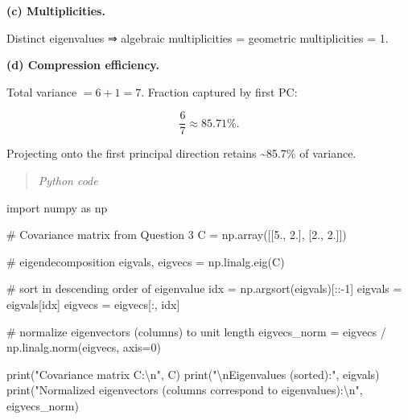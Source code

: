\documentclass[
  letterpaper,
  DIV=11,
  numbers=noendperiod]{scrreprt}
\newenvironment{Shaded}{\begin{snugshade}}{\end{snugshade}}
\newcommand{\BuiltInTok}[1]{\textcolor[rgb]{0.00,0.23,0.31}{#1}}
\newcommand{\CharTok}[1]{\textcolor[rgb]{0.13,0.47,0.30}{#1}}
\newcommand{\CommentTok}[1]{\textcolor[rgb]{0.37,0.37,0.37}{#1}}
\newcommand{\DecValTok}[1]{\textcolor[rgb]{0.68,0.00,0.00}{#1}}
\newcommand{\FloatTok}[1]{\textcolor[rgb]{0.68,0.00,0.00}{#1}}
\newcommand{\ImportTok}[1]{\textcolor[rgb]{0.00,0.46,0.62}{#1}}
\newcommand{\NormalTok}[1]{\textcolor[rgb]{0.00,0.23,0.31}{#1}}
\newcommand{\OperatorTok}[1]{\textcolor[rgb]{0.37,0.37,0.37}{#1}}
\newcommand{\StringTok}[1]{\textcolor[rgb]{0.13,0.47,0.30}{#1}}
\begin{document}
\textbf{(c) Multiplicities.}

Distinct eigenvalues ⇒ algebraic multiplicities = geometric
multiplicities = 1.

\textbf{(d) Compression efficiency.}

Total variance \(=6+1=7\). Fraction captured by first PC:

\[\frac{6}{7}\approx 85.71\%.\]

Projecting onto the first principal direction retains
\textasciitilde85.7\% of variance.

\begin{quote}
\emph{Python code}
\end{quote}

\begin{Shaded}
\begin{Highlighting}[]
\ImportTok{import}\NormalTok{ numpy }\ImportTok{as}\NormalTok{ np}

\CommentTok{\# Covariance matrix from Question 3}
\NormalTok{C }\OperatorTok{=}\NormalTok{ np.array([[}\FloatTok{5.}\NormalTok{, }\FloatTok{2.}\NormalTok{],}
\NormalTok{              [}\FloatTok{2.}\NormalTok{, }\FloatTok{2.}\NormalTok{]])}

\CommentTok{\# eigendecomposition}
\NormalTok{eigvals, eigvecs }\OperatorTok{=}\NormalTok{ np.linalg.eig(C)}

\CommentTok{\# sort in descending order of eigenvalue}
\NormalTok{idx }\OperatorTok{=}\NormalTok{ np.argsort(eigvals)[::}\OperatorTok{{-}}\DecValTok{1}\NormalTok{]}
\NormalTok{eigvals }\OperatorTok{=}\NormalTok{ eigvals[idx]}
\NormalTok{eigvecs }\OperatorTok{=}\NormalTok{ eigvecs[:, idx]}

\CommentTok{\# normalize eigenvectors (columns) to unit length}
\NormalTok{eigvecs\_norm }\OperatorTok{=}\NormalTok{ eigvecs }\OperatorTok{/}\NormalTok{ np.linalg.norm(eigvecs, axis}\OperatorTok{=}\DecValTok{0}\NormalTok{)}

\BuiltInTok{print}\NormalTok{(}\StringTok{"Covariance matrix C:}\CharTok{\textbackslash{}n}\StringTok{"}\NormalTok{, C)}
\BuiltInTok{print}\NormalTok{(}\StringTok{"}\CharTok{\textbackslash{}n}\StringTok{Eigenvalues (sorted):"}\NormalTok{, eigvals)}
\BuiltInTok{print}\NormalTok{(}\StringTok{"Normalized eigenvectors (columns correspond to eigenvalues):}\CharTok{\textbackslash{}n}\StringTok{"}\NormalTok{, eigvecs\_norm)}


\end{Highlighting}
\end{Shaded}
\end{document}
